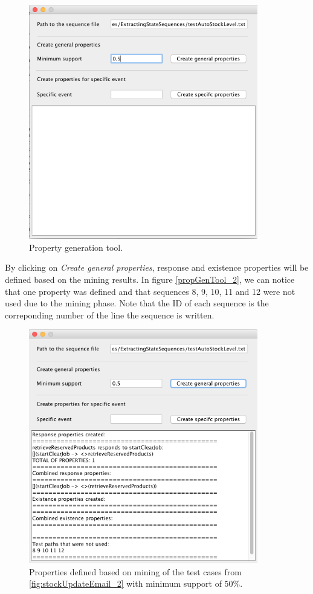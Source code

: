 \begin{figure}[htb]
\centering
\includegraphics[width=10cm]{figuras/propGenTool_1}
\caption{\label{fig:propGenTool_1} Property generation tool.}
\end{figure}

By clicking on \textit{Create general properties}, response and existence properties will be defined based on the mining results. In figure \ref{propGenTool_2}, we can notice that one property was defined and that sequences 8, 9, 10, 11 and 12 were not used due to the mining phase. Note that the ID of each sequence is the correponding number of the line the sequence is written.

\begin{figure}[htb]
\centering
\includegraphics[width=10cm]{figuras/propGenTool_2}
\caption{\label{fig:propGenTool_2} Properties defined based on mining of the test cases from \ref{fig:stockUpdateEmail_2} with minimum support of $50\%$.}
\end{figure}

